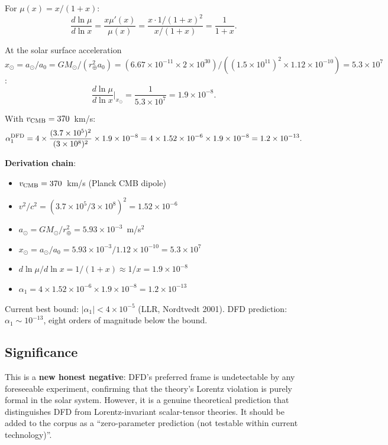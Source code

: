\documentclass[11pt]{article}
\newcommand{\ee}[1]{\times 10^{#1}}
\begin{document}
For $\mu(x) = x/(1+x)$:
\begin{equation}
\frac{d\ln\mu}{d\ln x} = \frac{x\mu'(x)}{\mu(x)}
= \frac{x \cdot 1/(1+x)^2}{x/(1+x)} = \frac{1}{1+x}.
\end{equation}

At the solar surface acceleration $x_\odot = a_\odot/a_0
= GM_\odot/(r_\oplus^2 a_0) = (6.67\ee{-11}\times 2\ee{30})/
((1.5\ee{11})^2 \times 1.12\ee{-10}) = 5.3\ee{7}$:
\begin{equation}
\frac{d\ln\mu}{d\ln x}\bigg|_{x_\odot} = \frac{1}{5.3\ee{7}}
= 1.9\ee{-8}.
\end{equation}

With $v_{\rm CMB} = 370$~km/s:
\begin{equation}
\alpha_1^{\rm DFD} = 4 \times \frac{(3.7\ee{5})^2}{(3\ee{8})^2}
\times 1.9\ee{-8}
= 4 \times 1.52\ee{-6} \times 1.9\ee{-8}
= 1.2\ee{-13}.
\end{equation}

\textbf{Derivation chain}:
\begin{itemize}[nosep]
\item $v_{\rm CMB} = 370$~km/s (Planck CMB dipole)
\item $v^2/c^2 = (3.7\ee{5}/3\ee{8})^2 = 1.52\ee{-6}$
\item $a_\odot = GM_\odot/r_\oplus^2 = 5.93\ee{-3}$~m/s$^2$
\item $x_\odot = a_\odot/a_0 = 5.93\ee{-3}/1.12\ee{-10} = 5.3\ee{7}$
\item $d\ln\mu/d\ln x = 1/(1+x) \approx 1/x = 1.9\ee{-8}$
\item $\alpha_1 = 4 \times 1.52\ee{-6} \times 1.9\ee{-8}
  = 1.2\ee{-13}$
\end{itemize}

Current best bound: $|\alpha_1| < 4\ee{-5}$ (LLR, Nordtvedt 2001).
DFD prediction: $\alpha_1 \sim 10^{-13}$, eight orders of magnitude
below the bound.

\subsection{Significance}

This is a \textbf{new honest negative}: DFD's preferred frame is
undetectable by any foreseeable experiment, confirming that the theory's
Lorentz violation is purely formal in the solar system.  However, it is
a genuine theoretical prediction that distinguishes DFD from
Lorentz-invariant scalar-tensor theories.  It should be added to the
corpus as a ``zero-parameter prediction (not testable within current
technology)''.
\end{document}
